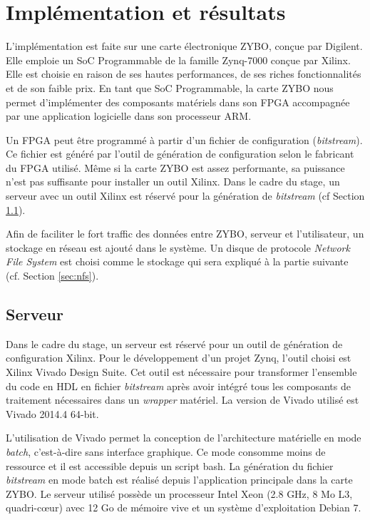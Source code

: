 \chapter{Implémentation et résultats}
\label{chap:implementation}
L'implémentation est faite sur une carte électronique ZYBO\cite{zyboweb}, 
conçue par Digilent. Elle emploie un SoC Programmable de la famille Zynq-7000 conçue par Xilinx.
Elle est choisie en raison de ses hautes performances, de ses riches fonctionnalités et de son faible prix. 
En tant que SoC Programmable, la carte ZYBO nous permet d'implémenter
des composants matériels dans son FPGA accompagnée par une application logicielle dans son processeur ARM.

Un FPGA peut être programmé à partir d'un fichier de configuration (\emph{bitstream}).
Ce fichier est généré par l'outil de génération de configuration selon le fabricant du FPGA utilisé.
Même si la carte ZYBO est assez performante, sa puissance n'est pas suffisante pour
installer un outil Xilinx. Dans le cadre du stage, un serveur avec un outil Xilinx est réservé pour la génération de
\emph{bitstream} (cf Section \ref{sec:serveur}).

Afin de faciliter le fort traffic des données entre ZYBO, serveur et l'utilisateur, un stockage en réseau
est ajouté dans le système. Un disque de protocole \emph{Network File System} est choisi comme le stockage
qui sera expliqué à la partie suivante (cf. Section \ref{sec:nfs}).

\section{Serveur}
\label{sec:serveur}
Dans le cadre du stage, un serveur est réservé pour un outil de génération de configuration Xilinx.
Pour le développement d'un projet Zynq, l'outil choisi est Xilinx Vivado Design Suite.
Cet outil est nécessaire pour transformer l'ensemble du code en HDL en fichier \emph{bitstream} après
avoir intégré tous les composants de traitement nécessaires dans un \emph{wrapper} matériel.
La version de Vivado utilisé est Vivado 2014.4 64-bit.

L'utilisation de Vivado permet la conception de l'architecture matérielle en mode \emph{batch}, c'est-à-dire sans interface
graphique. Ce mode consomme moins de ressource et il est accessible depuis un script bash.
La génération du fichier \emph{bitstream} en mode batch est réalisé depuis
l'application principale dans la carte ZYBO.
Le serveur utilisé possède un processeur Intel Xeon (2.8 GHz, 8 Mo L3, quadri-cœur)
avec 12 Go de mémoire vive et un système d'exploitation Debian 7.

